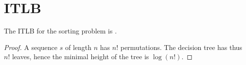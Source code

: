 \section{ITLB}
\label{tree:sorting:ITLB}

\begin{theorem}
The ITLB for the sorting problem is .
\end{theorem}

\begin{proof}
A sequence $s$ of length $n$ has $n!$ permutations. The decision tree has thus $n!$ leaves, hence the minimal height of the tree is $\log(n!)$.
\end{proof}

